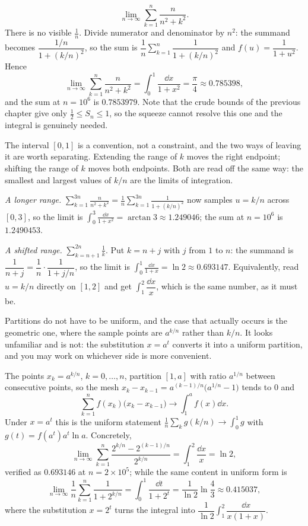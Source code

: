 \begin{worked}
\[\lim_{n\to\infty}\sum_{k=1}^{n}\frac{n}{n^{2}+k^{2}}.\]
There is no visible $\tfrac1n$. Divide numerator and denominator by $n^{2}$: the summand becomes $\dfrac{1/n}{1+(k/n)^{2}}$, so the sum is $\dfrac1n\displaystyle\sum_{k=1}^{n}\dfrac{1}{1+(k/n)^{2}}$ and $f(u)=\dfrac{1}{1+u^{2}}$. Hence
\[\lim_{n\to\infty}\sum_{k=1}^{n}\frac{n}{n^{2}+k^{2}}=\int_{0}^{1}\frac{\dd x}{1+x^{2}}=\frac{\pi}{4}\approx0.785398,\]
and the sum at $n=10^{6}$ is $0.7853979$. Note that the crude bounds of the previous chapter give only $\tfrac12\leq S_{n}\leq1$, so the squeeze cannot resolve this one and the integral is genuinely needed.
\end{worked}

The interval $[0,1]$ is a convention, not a constraint, and the two ways of leaving it are worth separating. Extending the range of $k$ moves the right endpoint; shifting the range of $k$ moves both endpoints. Both are read off the same way: the smallest and largest values of $k/n$ are the limits of integration.

\begin{worked}
\emph{A longer range.} $\displaystyle\sum_{k=1}^{3n}\frac{n}{n^{2}+k^{2}}=\frac1n\sum_{k=1}^{3n}\frac{1}{1+(k/n)^{2}}$ now samples $u=k/n$ across $[0,3]$, so the limit is $\displaystyle\int_{0}^{3}\frac{\dd x}{1+x^{2}}=\arctan3\approx1.249046$; the sum at $n=10^{6}$ is $1.2490453$.

\emph{A shifted range.} $\displaystyle\sum_{k=n+1}^{2n}\frac1k$. Put $k=n+j$ with $j$ from $1$ to $n$: the summand is $\dfrac{1}{n+j}=\dfrac1n\cdot\dfrac{1}{1+j/n}$, so the limit is $\displaystyle\int_{0}^{1}\frac{\dd x}{1+x}=\ln2\approx0.693147$. Equivalently, read $u=k/n$ directly on $[1,2]$ and get $\int_{1}^{2}\dfrac{\dd x}{x}$, which is the same number, as it must be.
\end{worked}

Partitions do not have to be uniform, and the case that actually occurs is the geometric one, where the sample points are $a^{k/n}$ rather than $k/n$. It looks unfamiliar and is not: the substitution $x=a^{t}$ converts it into a uniform partition, and you may work on whichever side is more convenient.

\begin{keynote}
The points $x_{k}=a^{k/n}$, $k=0,\ldots,n$, partition $[1,a]$ with ratio $a^{1/n}$ between consecutive points, so the mesh $x_{k}-x_{k-1}=a^{(k-1)/n}\bigl(a^{1/n}-1\bigr)$ tends to $0$ and
\[\sum_{k=1}^{n}f(x_{k})\bigl(x_{k}-x_{k-1}\bigr)\longrightarrow\int_{1}^{a}f(x)\dd x .\]
Under $x=a^{t}$ this is the uniform statement $\tfrac1n\sum_{k}g(k/n)\to\int_{0}^{1}g$ with $g(t)=f(a^{t})a^{t}\ln a$. Concretely,
\[\lim_{n\to\infty}\sum_{k=1}^{n}\frac{2^{k/n}-2^{(k-1)/n}}{2^{k/n}}=\int_{1}^{2}\frac{\dd x}{x}=\ln2,\]
verified as $0.693146$ at $n=2\times10^{5}$; while the same content in uniform form is
\[\lim_{n\to\infty}\frac1n\sum_{k=1}^{n}\frac{1}{1+2^{k/n}}=\int_{0}^{1}\frac{\dd t}{1+2^{t}}=\frac{1}{\ln2}\ln\frac43\approx0.415037,\]
where the substitution $x=2^{t}$ turns the integral into $\dfrac{1}{\ln2}\displaystyle\int_{1}^{2}\dfrac{\dd x}{x(1+x)}$.
\end{keynote}

